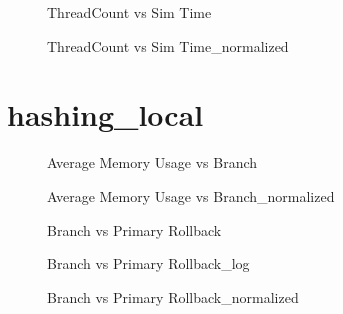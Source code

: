 \vspace{1cm}
\begin{figure}[H]
\centering

\caption{ThreadCount vs Sim Time}
\end{figure}
\vspace{1cm}
\newpage
\begin{figure}[H]
\centering

\caption{ThreadCount vs Sim Time\_normalized}
\end{figure}
\vspace{1cm}
\newpage

\section{hashing\_local}
\begin{figure}[H]
\centering

\caption{Average Memory Usage vs Branch}
\end{figure}
\vspace{1cm}
\begin{figure}[H]
\centering

\caption{Average Memory Usage vs Branch\_normalized}
\end{figure}
\vspace{1cm}
\newpage
\begin{figure}[H]
\centering

\caption{Branch vs Primary Rollback}
\end{figure}
\vspace{1cm}
\begin{figure}[H]
\centering

\caption{Branch vs Primary Rollback\_log}
\end{figure}
\vspace{1cm}
\newpage
\begin{figure}[H]
\centering

\caption{Branch vs Primary Rollback\_normalized}
\end{figure}
